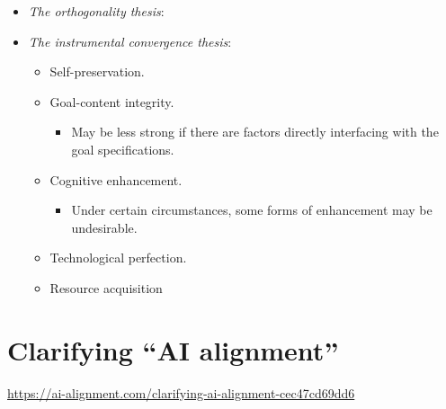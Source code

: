 \begin{itemize}
    \item \emph{The orthogonality thesis}: 
    \item \emph{The instrumental convergence thesis}: 
    \begin{itemize}
        \item Self-preservation.
        \item Goal-content integrity.
        \begin{itemize}
            \item May be less strong if there are factors directly interfacing with the goal specifications.
        \end{itemize}
        \item Cognitive enhancement.
        \begin{itemize}
            \item Under certain circumstances, some forms of enhancement may be undesirable.
        \end{itemize}
        \item Technological perfection.
        \item Resource acquisition
    \end{itemize}
\end{itemize}


\section{Clarifying ``AI alignment''}

\url{https://ai-alignment.com/clarifying-ai-alignment-cec47cd69dd6}


